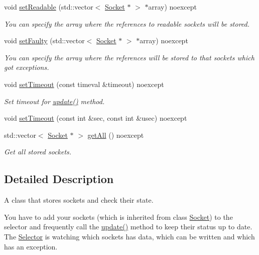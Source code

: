 \begin{DoxyCompactItemize}
void \hyperlink{classtnnf_1_1_selector_add3b3f0bc48901bc1630d93187e2147b}{set\+Readable} (std\+::vector$<$ \hyperlink{classtnnf_1_1_socket}{Socket} $\ast$ $>$ $\ast$array) noexcept
\begin{DoxyCompactList}\small\item\em You can specify the array where the references to readable sockets will be stored. \end{DoxyCompactList}\item 
void \hyperlink{classtnnf_1_1_selector_a9634a32b113ffe1784ac893e07b8b53d}{set\+Faulty} (std\+::vector$<$ \hyperlink{classtnnf_1_1_socket}{Socket} $\ast$ $>$ $\ast$array) noexcept
\begin{DoxyCompactList}\small\item\em You can specify the array where the references will be stored to that sockets which got exceptions. \end{DoxyCompactList}\item 
void \hyperlink{classtnnf_1_1_selector_a88ea38e344d6ba504fe36e737f95290b}{set\+Timeout} (const timeval \&timeout) noexcept
\begin{DoxyCompactList}\small\item\em Set timeout for \hyperlink{classtnnf_1_1_selector_a56fd12ff21981124269b5bd5088af35e}{update()} method. \end{DoxyCompactList}\item 
void \hyperlink{classtnnf_1_1_selector_a35ab47e18c229cb81d9947692c8eefdd}{set\+Timeout} (const int \&sec, const int \&usec) noexcept
\item 
std\+::vector$<$ \hyperlink{classtnnf_1_1_socket}{Socket} $\ast$ $>$ \hyperlink{classtnnf_1_1_selector_ad8685ca66ee6eed19bb7de4f024b57df}{get\+All} () noexcept
\begin{DoxyCompactList}\small\item\em Get all stored sockets. \end{DoxyCompactList}\end{DoxyCompactItemize}


\subsection{Detailed Description}
A class that stores sockets and check their state. 

You have to add your sockets (which is inherited from class \hyperlink{classtnnf_1_1_socket}{Socket}) to the selector and frequently call the \hyperlink{classtnnf_1_1_selector_a56fd12ff21981124269b5bd5088af35e}{update()} method to keep their status up to date. The \hyperlink{classtnnf_1_1_selector}{Selector} is watching which sockets has data, which can be written and which has an exception. 

